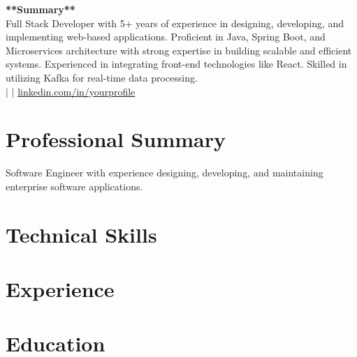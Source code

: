 \documentclass[letterpaper,10pt]{article}
\newcommand{\resumeSubHeadingListStart}{\begin{itemize}[leftmargin=0.15in, label={}]}
\newcommand{\resumeSubHeadingListEnd}{\end{itemize}}
\begin{document}
\begin{center}
    {\Huge \textbf{**Summary**}} \\ \vspace{2pt}
    \small Full Stack Developer with 5+ years of experience in designing, developing, and implementing web-based applications. Proficient in Java, Spring Boot, and Microservices architecture with strong expertise in building scalable and efficient systems. Experienced in integrating front-end technologies like React. Skilled in utilizing Kafka for real-time data processing. \\ \vspace{3pt}
    \small  \quad $|$ \quad \href{mailto:}{} \quad $|$ \quad
    \href{https://linkedin.com/in/yourprofile}{linkedin.com/in/yourprofile}
\end{center}

\section{Professional Summary}
\small{Software Engineer with experience designing, developing, and maintaining enterprise software applications.}

\section{Technical Skills}
 \begin{itemize}[leftmargin=0.15in, label={}]
    \small{\item{
     
    }}
 \end{itemize}

\section{Experience}
  \resumeSubHeadingListStart
    
  \resumeSubHeadingListEnd

\section{Education}
  \resumeSubHeadingListStart
    
  \resumeSubHeadingListEnd



\end{document}
